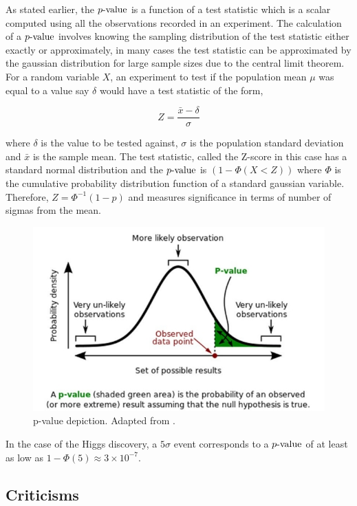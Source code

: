 As stated earlier, the $\mathop{p{\textnormal{-value}}}$ is a function of a test statistic which is a scalar computed using all the observations recorded in an experiment. The calculation of a $\mathop{p{\textnormal{-value}}}$ involves knowing the sampling distribution of the test statistic either exactly or approximately, in many cases the test statistic can be approximated by the gaussian distribution for large sample sizes due to the central limit theorem. For a random variable $X$, an experiment to test if the population mean $\mu$ was equal to a value say $\delta$ would have a test statistic of the form, 

\begin{equation}
Z = \frac{\bar{x} - \delta}{\sigma} 
\end{equation} 

where $\delta$ is the value to be tested against, $\sigma$ is the population standard deviation and $\bar{x}$ is the sample mean. The test statistic, called the Z-score in this case has a standard normal distribution and the $\mathop{p{\textnormal{-value}}}$ is $(1 - \Phi(X < Z))$ where $\Phi$ is the cumulative probability distribution function of a standard gaussian variable. Therefore, $Z = \Phi^{-1}(1-p)$ and measures significance in terms of number of sigmas from the mean. 

\begin{figure}
\includegraphics[scale=0.6]{images/pvalue.jpg}
\caption{p-value depiction. Adapted from \cite{pvalue}.}
\end{figure}

In the case of the Higgs discovery, a $5\sigma$ event corresponds to a $\mathop{p{\textnormal{-value}}}$ of at least as low as $1 - \Phi(5) \approx 3 \times 10^{-7}$.
 
\subsection{Criticisms}

